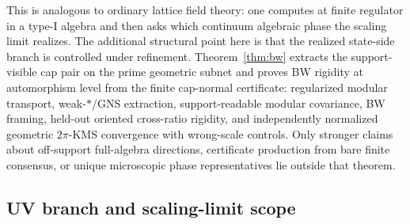 \documentclass[11pt]{article}
\begin{document}
This is analogous to ordinary lattice field theory: one computes at finite regulator in a type-I algebra and then asks which continuum algebraic phase the scaling limit realizes. The additional structural point here is that the realized state-side branch is controlled under refinement. Theorem~\ref{thm:bw} extracts the support-visible cap pair on the prime geometric subnet and proves BW rigidity at automorphism level from the finite cap-normal certificate: regularized modular transport, weak-\(*\)/GNS extraction, support-readable modular covariance, BW framing, held-out oriented cross-ratio rigidity, and independently normalized geometric \(2\pi\)-KMS convergence with wrong-scale controls. Only stronger claims about off-support full-algebra directions, certificate production from bare finite consensus, or unique microscopic phase representatives lie outside that theorem.
\subsection{UV branch and scaling-limit scope}
\end{document}

